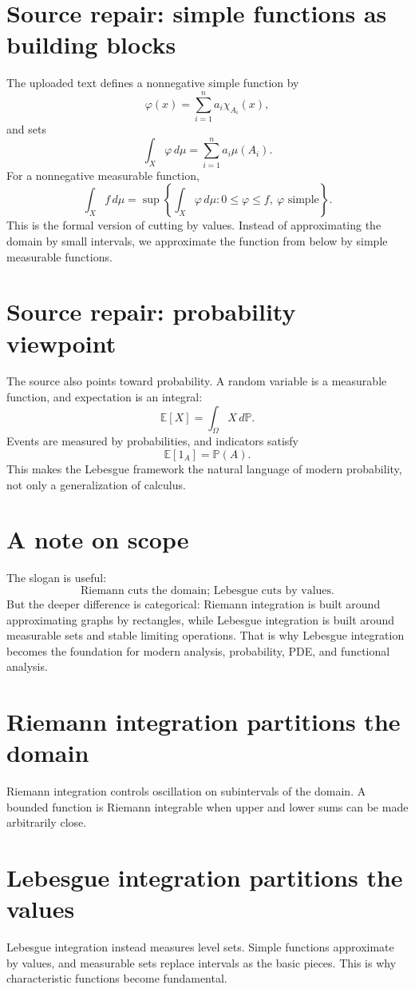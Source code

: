 \section{Source repair: simple functions as building blocks}

The uploaded text defines a nonnegative simple function by
\[
  \varphi(x)=\sum_{i=1}^n a_i\chi_{A_i}(x),
\]
and sets
\[
  \int_X \varphi\,d\mu=\sum_{i=1}^n a_i\mu(A_i).
\]
For a nonnegative measurable function,
\[
  \int_X f\,d\mu
  =\sup\left\{\int_X\varphi\,d\mu:0\le\varphi\le f,\ \varphi\text{ simple}\right\}.
\]
This is the formal version of cutting by values.  Instead of approximating the domain by small intervals, we approximate the function from below by simple measurable functions.

\section{Source repair: probability viewpoint}

The source also points toward probability.  A random variable is a measurable function, and expectation is an integral:
\[
  \mathbb E[X]=\int_\Omega X\,d\mathbb P.
\]
Events are measured by probabilities, and indicators satisfy
\[
  \mathbb E[1_A]=\mathbb P(A).
\]
This makes the Lebesgue framework the natural language of modern probability, not only a generalization of calculus.

\section{A note on scope}

The slogan is useful:
\[
  \text{Riemann cuts the domain; Lebesgue cuts by values.}
\]
But the deeper difference is categorical: Riemann integration is built around approximating graphs by rectangles, while Lebesgue integration is built around measurable sets and stable limiting operations.  That is why Lebesgue integration becomes the foundation for modern analysis, probability, PDE, and functional analysis.

\section{Riemann integration partitions the domain}
Riemann integration controls oscillation on subintervals of the domain.  A bounded function is Riemann integrable when upper and lower sums can be made arbitrarily close.
\section{Lebesgue integration partitions the values}
Lebesgue integration instead measures level sets.  Simple functions approximate by values, and measurable sets replace intervals as the basic pieces.  This is why characteristic functions become fundamental.
